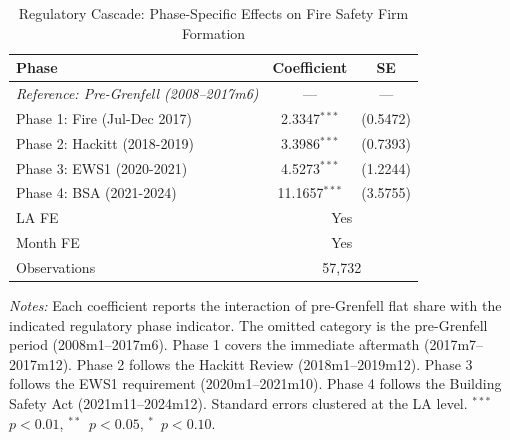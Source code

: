 \begin{table}[htbp]
\centering
\caption{Regulatory Cascade: Phase-Specific Effects on Fire Safety Firm Formation}
\label{tab:phases}
\begin{tabular}{lcc}
\hline\hline
Phase & Coefficient & SE \\
\hline
\textit{Reference: Pre-Grenfell (2008--2017m6)} & --- & --- \\
Phase 1: Fire (Jul-Dec 2017) & 2.3347$^{***}$ & (0.5472) \\
Phase 2: Hackitt (2018-2019) & 3.3986$^{***}$ & (0.7393) \\
Phase 3: EWS1 (2020-2021) & 4.5273$^{***}$ & (1.2244) \\
Phase 4: BSA (2021-2024) & 11.1657$^{***}$ & (3.5755) \\
\hline
LA FE & \multicolumn{2}{c}{Yes} \\
Month FE & \multicolumn{2}{c}{Yes} \\
Observations & \multicolumn{2}{c}{57,732} \\
\hline\hline
\end{tabular}
\begin{tablenotes}[flushleft]
\small
\item \textit{Notes:} Each coefficient reports the interaction of pre-Grenfell flat share with the indicated regulatory phase indicator. The omitted category is the pre-Grenfell period (2008m1--2017m6). Phase 1 covers the immediate aftermath (2017m7--2017m12). Phase 2 follows the Hackitt Review (2018m1--2019m12). Phase 3 follows the EWS1 requirement (2020m1--2021m10). Phase 4 follows the Building Safety Act (2021m11--2024m12). Standard errors clustered at the LA level. $^{***}$~$p<0.01$, $^{**}$~$p<0.05$, $^{*}$~$p<0.10$.
\end{tablenotes}
\end{table}

